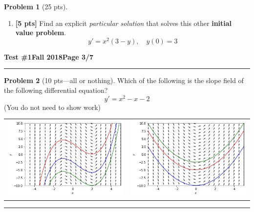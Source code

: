 \documentclass[12pt]{article}
\theoremstyle{definition}
\newtheorem{problem}{Problem}
\begin{document}
\begin{problem}[25 pts]
\begin{enumerate}
  \item \textbf{[5 pts]} Find an explicit \emph{particular solution} that solves this other \textbf{initial value problem}.
    \begin{equation*}
      y' = x^2 (3-y), \quad y(0) = 3
    \end{equation*}
    \begin{flushright}
    \end{flushright}
  \end{enumerate}
\end{problem}
\newpage

\hfill{\large\bf Test \#1}\hfill{\large\bf Fall 2018}\hfill{\large\bf Page 3/7}\hrule

\bigskip
\begin{problem}[10 pts---all or nothing]
  Which of the following is the slope field of the following differential equation?
  \begin{equation*}
    y' = x^2 -x-2
  \end{equation*}
  \noindent (You do not need to show work)
  \begin{center}
    \begin{tabular}{cc}
      \includegraphics[width=0.5\linewidth]{quiver1.png} & \includegraphics[width=0.5\linewidth]{quiver2.png}
    \end{tabular}
  \end{center}
\end{problem}
\hrule
\end{document}
